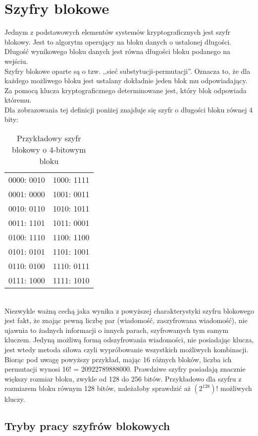 \section{Szyfry blokowe}
Jednym z podstawowych elementów systemów kryptograficznych jest szyfr blokowy. Jest to algorytm operujący na bloku danych o ustalonej długości. Długość wynikowego bloku danych jest równa długości bloku podanego na wejściu. \\
Szyfry blokowe oparte są o tzw. ,,sieć substytucji-permutacji''. 
Oznacza to, że dla każdego możliwego bloku jest ustalany dokładnie jeden blok mu odpowiadający. Za pomocą klucza kryptograficznego determinowane jest, który blok odpowiada któremu. \\
Dla zobrazowania tej definicji poniżej znajduje się szyfr o długości bloku równej 4 bity:
\begin{table}[h!]
\centering
\caption{Przykładowy szyfr blokowy o 4-bitowym bloku}
\begin{tabular}{ |c|c| } 
 \hline
	0000: 0010 & 1000: 1111 \\
	0001: 0000 & 1001: 0011 \\
	0010: 0110 & 1010: 1011 \\
	0011: 1101 & 1011: 0001 \\
	0100: 1110 & 1100: 1100 \\
	0101: 0101 & 1101: 1001 \\
	0110: 0100 & 1110: 0111 \\
	0111: 1000 & 1111: 1010 \\
 \hline
\end{tabular}
\end{table} \\
Niezwykle ważną cechą jaka wynika z powyższej charakterystyki szyfru blokowego jest fakt, że znając pewną liczbę par (wiadomość, zaszyfrowana wiadomość), nie ujawnia to żadnych informacji o innych parach, szyfrowanych tym samym kluczem.
Jedyną możliwą formą odszyfrowania wiadomości, nie posiadając klucza, jest wtedy metoda siłowa czyli wypróbowanie wszystkich możliwych kombinacji. 
Biorąc pod uwagę powyższy przykład, mając 16 różnych bloków, liczba ich permutacji wynosi 16! = 20922789888000. 
Prawdziwe szyfry posiadają znacznie większy rozmiar bloku, zwykle od 128 do 256 bitów. Przykładowo dla szyfru z rozmiarem bloku równym 128 bitów, należałoby sprawdzić aż $(2^{128})!$ możliwych kluczy.

\subsection{Tryby pracy szyfrów blokowych}
